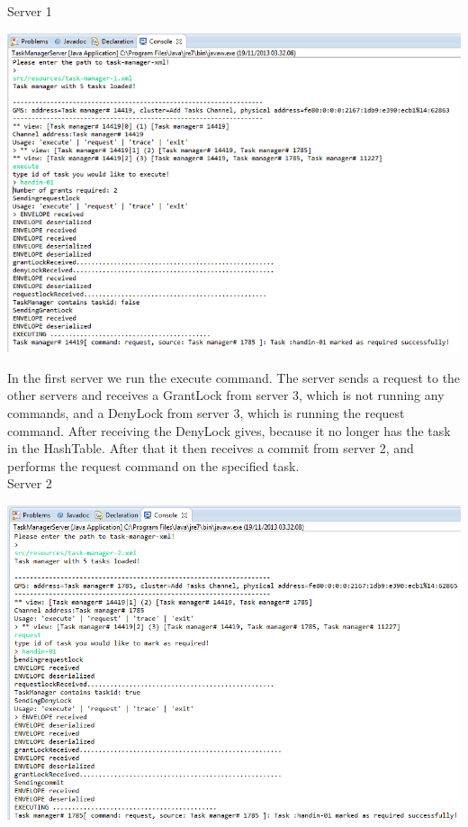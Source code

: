 \caption{Server 1}
\includegraphics[scale=0.6]{images/CCServer1.png}

In the first server we run the execute command. The server sends a request to the other servers and receives a GrantLock from server 3, which is not running any commands, and a DenyLock from server 3, which is running the request command. After receiving the DenyLock gives, because it no longer has the task in the HashTable. After that it then receives a commit from server 2, and performs the request command on the specified task. \\

\caption{Server 2}
\includegraphics[scale=0.6]{images/CCServer2.png}

